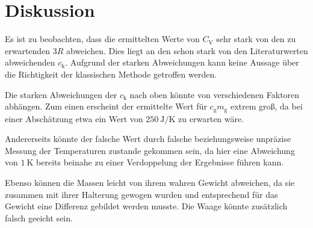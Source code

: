 
\section{Diskussion}
\label{sec:Diskussion}

Es ist zu beobachten, dass die ermittelten Werte von $C_\text{V}$ sehr stark von den zu erwartenden $3R$ abweichen. Dies liegt an den schon stark von den Literaturwerten abweichenden $c_\text{k}$. Aufgrund der starken Abweichungen kann keine Aussage über die Richtigkeit der klassischen Methode getroffen werden. 

Die starken Abweichungen der $c_\text{k}$ nach oben könnte von verschiedenen Faktoren abhängen. Zum einen erscheint der ermittelte Wert für $c_\text{g}m_\text{g}$ extrem groß, da bei einer Abschätzung etwa ein Wert von $\SI{250}{\joule\per\kelvin}$ zu erwarten wäre.

Andererseits könnte der falsche Wert durch falsche beziehungsweise unpräzise Messung der Temperaturen zustande gekommen sein, da hier eine Abweichung von $\SI{1}{\kelvin}$ bereits beinahe zu einer Verdoppelung der Ergebnisse führen kann.

Ebenso können die Massen leicht von ihrem wahren Gewicht abweichen, da sie zusammen mit ihrer Halterung gewogen wurden und entsprechend für das Gewicht eine Differenz gebildet werden musste. Die Waage könnte zusätzlich falsch geeicht sein. 

  